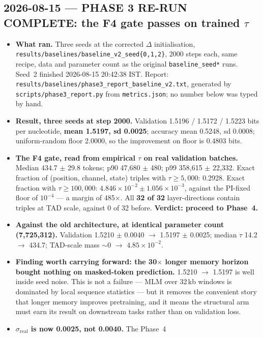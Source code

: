 \documentclass[11pt,a4paper]{article}
\newcommand{\code}[1]{\texttt{\small #1}}
\begin{document}
\subsection*{2026-08-15 --- PHASE 3 RE-RUN COMPLETE: the F4 gate passes on
trained $\tau$}

\begin{itemize}
\item \textbf{What ran.} Three seeds at the corrected $\Delta$ initialisation,
\code{results/baselines/baseline\_v2\_seed\{0,1,2\}}, 2000 steps each, same
recipe, data and parameter count as the original \code{baseline\_seed*} runs.
Seed~2 finished 2026-08-15 20:42:38 IST. Report:
\code{results/baselines/phase3\_report\_baseline\_v2.txt}, generated by
\code{scripts/phase3\_report.py} from \code{metrics.json}; no number below was
typed by hand.
\item \textbf{Result, three seeds at step 2000.} Validation 1.5196 / 1.5172 /
1.5223 bits per nucleotide, \textbf{mean 1.5197, sd 0.0025}; accuracy mean
0.5248, sd 0.0008; uniform-random floor 2.0000, so the improvement on floor is
0.4803 bits.
\item \textbf{The F4 gate, read from empirical $\tau$ on real validation
batches.} Median 434.7 $\pm$ 29.8 tokens; p90 47{,}680 $\pm$ 480; p99 358{,}615
$\pm$ 22{,}332. Exact fraction of (position, channel, state) triples with $\tau
\ge 5{,}000$: 0.2928. Exact fraction with $\tau \ge 100{,}000$:
\textbf{$4.846\times10^{-2} \pm 1.056\times10^{-3}$}, against the
PI-fixed floor of $10^{-4}$ --- a margin of 485$\times$. All \textbf{32 of 32}
layer-directions contain triples at TAD scale, against 0 of 32 before.
\textbf{Verdict: proceed to Phase~4.}
\item \textbf{Against the old architecture, at identical parameter count
(7{,}725{,}312).} Validation 1.5210 $\pm$ 0.0040 $\rightarrow$ 1.5197 $\pm$
0.0025; median $\tau$ 14.2 $\rightarrow$ 434.7; TAD-scale mass $\sim$0
$\rightarrow$ $4.85\times10^{-2}$.
\item \textbf{Finding worth carrying forward: the 30$\times$ longer memory
horizon bought nothing on masked-token prediction.} 1.5210 $\rightarrow$ 1.5197
is well inside seed noise. This is not a failure --- MLM over 32\,kb windows is
dominated by local sequence statistics --- but it removes the convenient story
that longer memory improves pretraining, and it means the structural arm must
earn its result on downstream tasks rather than on validation loss.
\item \textbf{$\sigma_{\mathrm{real}}$ is now 0.0025, not 0.0040.} The Phase~4

\end{itemize}
\end{document}
